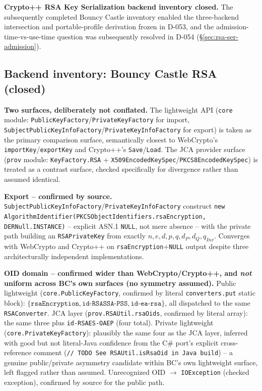 \documentclass[11pt,a4paper]{article}
\begin{document}
\textbf{Crypto++ RSA Key Serialization backend inventory closed.} The subsequently completed Bouncy Castle inventory enabled the three-backend intersection and portable-profile derivation frozen in D-053, and the admission-time-vs-use-time question was subsequently resolved in D-054 (\S\ref{sec:rsa-ser-admission}).

\subsection{Backend inventory: Bouncy Castle RSA (closed)}\label{sec:rsa-ser-bc}

\textbf{Two surfaces, deliberately not conflated.} The lightweight API (\texttt{core} module: \texttt{PublicKeyFactory}/\texttt{PrivateKeyFactory} for import, \texttt{SubjectPublicKeyInfoFactory}/\texttt{PrivateKeyInfoFactory} for export) is taken as the primary comparison surface, semantically closest to WebCrypto's \texttt{importKey}/\texttt{exportKey} and Crypto++'s \texttt{Save}/\texttt{Load}. The JCA provider surface (\texttt{prov} module: \texttt{KeyFactory.RSA} + \texttt{X509EncodedKeySpec}/\texttt{PKCS8EncodedKeySpec}) is treated as a contrast surface, checked specifically for divergence rather than assumed identical.

\textbf{Export -- confirmed by source.} \texttt{SubjectPublicKeyInfoFactory}/\texttt{PrivateKeyInfoFactory} construct \texttt{new AlgorithmIdentifier(PKCSObjectIdentifiers.rsaEncryption, DERNull.INSTANCE)} -- explicit ASN.1 \texttt{NULL}, not mere absence -- with the private path building an \texttt{RSAPrivateKey} from exactly $n,e,d,p,q,d_P,d_Q,q_{Inv}$. Converges with WebCrypto and Crypto++ on \texttt{rsaEncryption}+\texttt{NULL} output despite three architecturally independent implementations.

\textbf{OID domain -- confirmed wider than WebCrypto/Crypto++, and \emph{not} uniform across BC's own surfaces (no symmetry assumed).} Public lightweight (\texttt{core.PublicKeyFactory}, confirmed by literal \texttt{converters.put} static block): $\{\texttt{rsaEncryption}, \texttt{id-RSASSA-PSS}, \texttt{id-ea-rsa}\}$, all dispatched to the same \texttt{RSAConverter}. JCA layer (\texttt{prov.RSAUtil.rsaOids}, confirmed by literal array): the same three plus \texttt{id-RSAES-OAEP} (four total). Private lightweight (\texttt{core.PrivateKeyFactory}): plausibly the same four as the JCA layer, inferred with good but not literal-Java confidence from the C\# port's explicit cross-reference comment (\texttt{// TODO See RSAUtil.isRsaOid in Java build}) -- a genuine public/private asymmetry candidate within BC's own lightweight surface, left flagged rather than assumed. Unrecognized OID $\to$ \texttt{IOException} (checked exception), confirmed by source for the public path.
\end{document}
